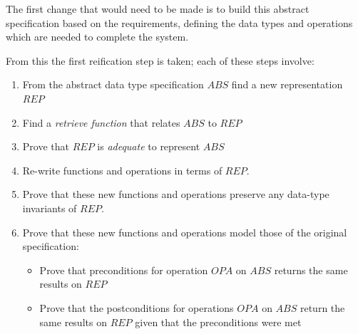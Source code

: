 \documentclass[a4paper, notitlepage, fleqn]{article}
\begin{document}
The first change that would need to be made is to build this abstract specification based on the
requirements, defining the data types and operations which are needed to complete the system.

From this the first reification step is taken; each of these steps involve:

\begin{enumerate}
\item From the abstract data type specification $ABS$ find a new representation $REP$
\item Find a \emph{retrieve function} that relates $ABS$ to $REP$ 
\item Prove that $REP$ is \emph{adequate} to represent $ABS$ 
\item Re-write functions and operations in terms of $REP$.
\item Prove that these new functions and operations preserve any data-type invariants of $REP$.
\item Prove that these new functions and operations model those of the original specification:
\begin{itemize}
\item Prove that preconditions for operation $OPA$ on $ABS$ returns the same results on 
$REP$
\item Prove that the postconditions for operations $OPA$ on $ABS$ return the same results on $REP$
given that the preconditions were met
\end{itemize}
\end{enumerate}





\end{document}
